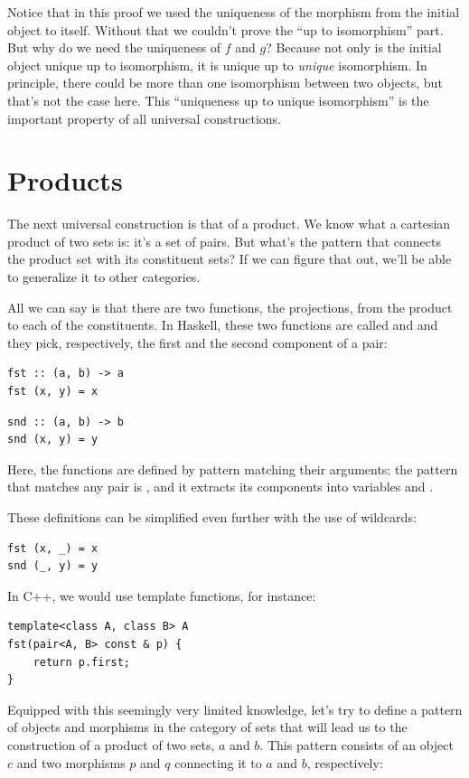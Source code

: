 Notice that in this proof we used the uniqueness of the morphism from
the initial object to itself. Without that we couldn't prove the ``up to
isomorphism'' part. But why do we need the uniqueness of $f$ and
$g$? Because not only is the initial object unique up to
isomorphism, it is unique up to \emph{unique} isomorphism. In principle,
there could be more than one isomorphism between two objects, but that's
not the case here. This ``uniqueness up to unique isomorphism'' is the
important property of all universal constructions.

\section{Products}

The next universal construction is that of a product. We know what a
cartesian product of two sets is: it's a set of pairs. But what's the
pattern that connects the product set with its constituent sets? If we
can figure that out, we'll be able to generalize it to other categories.

All we can say is that there are two functions, the projections, from
the product to each of the constituents. In Haskell, these two functions
are called  and  and they pick, respectively,
the first and the second component of a pair:

\begin{Verbatim}
fst :: (a, b) -> a
fst (x, y) = x
\end{Verbatim}

\begin{Verbatim}
snd :: (a, b) -> b
snd (x, y) = y
\end{Verbatim}
Here, the functions are defined by pattern matching their arguments: the
pattern that matches any pair is , and it extracts its
components into variables  and .

These definitions can be simplified even further with the use of
wildcards:

\begin{Verbatim}
fst (x, _) = x
snd (_, y) = y
\end{Verbatim}
In C++, we would use template functions, for instance:

\begin{Verbatim}
template<class A, class B> A
fst(pair<A, B> const & p) {
    return p.first;
}
\end{Verbatim}
Equipped with this seemingly very limited knowledge, let's try to define
a pattern of objects and morphisms in the category of sets that will
lead us to the construction of a product of two sets, $a$ and
$b$. This pattern consists of an object $c$ and two morphisms
$p$ and $q$ connecting it to $a$ and $b$,
respectively:

